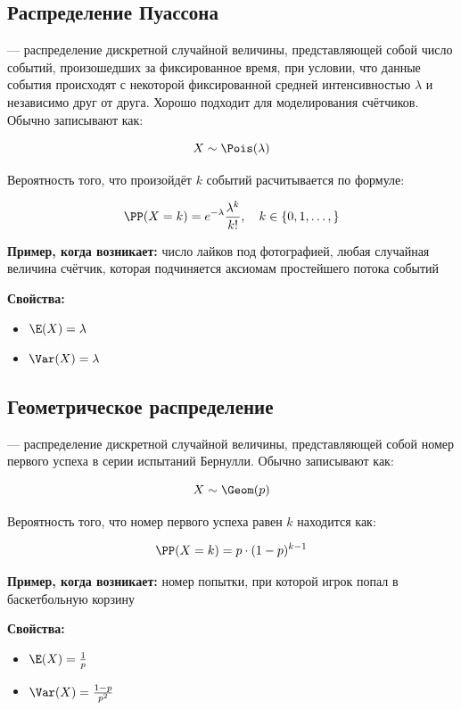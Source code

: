 \documentclass[12pt, a4paper, oneside]{article}
\begin{document}
\subsection*{Распределение Пуассона}

 --- распределение дискретной случайной величины, представляющей собой число событий, произошедших за фиксированное время, при условии, что данные события происходят с некоторой фиксированной средней интенсивностью $\lambda$ и независимо друг от друга. Хорошо подходит для моделирования счётчиков. Обычно записывают как:

$$
X \sim \Pois(\lambda)
$$

Вероятность того, что произойдёт $k$ событий расчитывается по формуле: 

$$
\PP(X = k) = e^{-\lambda} \dfrac{\lambda^k}{k!}, \quad k \in \{0, 1, \ldots, \}
$$

\textbf{Пример, когда возникает:} число лайков под фотографией, любая случайная величина счётчик, которая подчиняется аксиомам простейшего потока событий

\textbf{Свойства:}

\begin{itemize} 
\item $\E(X) = \lambda$
\item $\Var(X) = \lambda$
\end{itemize} 

\subsection*{Геометрическое распределение}

 --- распределение дискретной случайной величины, представляющей собой номер первого успеха в серии испытаний Бернулли. Обычно записывают как:

$$
X \sim \Geom(p)
$$

Вероятность того, что номер первого успеха равен $k$ находится как:

$$
\PP(X = k) = p \cdot (1 - p)^{k - 1}
$$

\textbf{Пример, когда возникает:} номер попытки, при которой игрок попал в баскетбольную корзину

\textbf{Свойства:}

\begin{itemize} 
\item $\E(X) = \frac{1}{p}$
\item $\Var(X) = \frac{1-p}{p^2}$
\end{itemize} 
\end{document}
